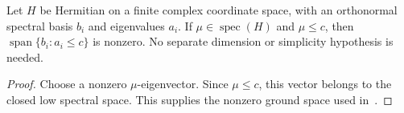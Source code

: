 \begin{theorem}
    \label{thm:spectral_value_nonzero_low_space}
    \leanok
    Let $H$ be Hermitian on a finite complex coordinate space, with an
    orthonormal spectral basis $b_i$ and eigenvalues $a_i$. If
    $\mu\in\operatorname{spec}(H)$ and $\mu\le c$, then
    $\operatorname{span}\{b_i:a_i\le c\}$ is nonzero.
    No separate dimension or simplicity hypothesis is needed.
\end{theorem}
\begin{proof}\leanok
    Choose a nonzero $\mu$-eigenvector. Since $\mu\le c$, this vector belongs
    to the closed low spectral space. This supplies the nonzero ground
    space used in~\cite[Proposition 4.10, lines 1062--1075]{Arad2016RigorousRG}.
\end{proof}
